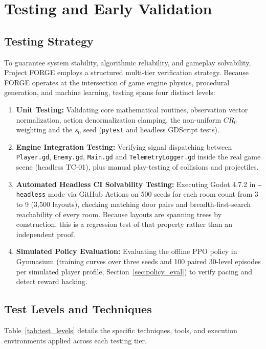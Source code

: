 \chapter{Testing and Early Validation}
\label{chap:testing}

\section{Testing Strategy}
To guarantee system stability, algorithmic reliability, and gameplay solvability, Project FORGE employs a structured multi-tier verification strategy. Because FORGE operates at the intersection of game engine physics, procedural generation, and machine learning, testing spans four distinct levels:
\begin{enumerate}
    \item \textbf{Unit Testing:} Validating core mathematical routines, observation vector normalization, action denormalization clamping, the non-uniform $CR_0$ weighting and the $s_0$ seed (\texttt{pytest} and headless GDScript tests).
    \item \textbf{Engine Integration Testing:} Verifying signal dispatching between \texttt{Player.gd}, \texttt{Enemy.gd}, \texttt{Main.gd} and \texttt{TelemetryLogger.gd} inside the real game scene (headless TC-01), plus manual play-testing of collisions and projectiles.
    \item \textbf{Automated Headless CI Solvability Testing:} Executing Godot 4.7.2 in \texttt{--headless} mode via GitHub Actions on 500 seeds for each room count from 3 to 9 (3,500 layouts), checking matching door pairs and breadth-first-search reachability of every room. Because layouts are spanning trees by construction, this is a regression test of that property rather than an independent proof.
    \item \textbf{Simulated Policy Evaluation:} Evaluating the offline PPO policy in Gymnasium (training curves over three seeds and 100 paired 30-level episodes per simulated player profile, Section~\ref{sec:policy_eval}) to verify pacing and detect reward hacking.
\end{enumerate}

\section{Test Levels and Techniques}
Table~\ref{tab:test_levels} details the specific techniques, tools, and execution environments applied across each testing tier.

